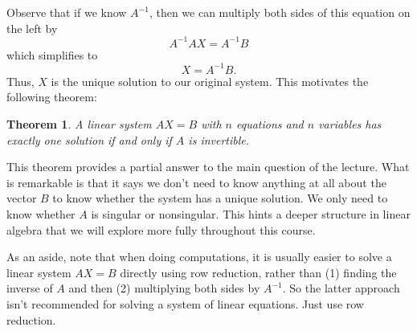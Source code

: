 \documentclass[10pt]{article}
\newtheorem{theorem}{Theorem}
\theoremstyle{definition}
\begin{document}
Observe that if we know $A^{-1}$, then we can multiply both sides of this
equation on the left by
\begin{equation*}
  A^{-1}AX = A^{-1}B
\end{equation*}
which simplifies to
\begin{equation}
  \label{eq:inverse-solution-to-linear-equation}
  X = A^{-1}B.
\end{equation}
Thus, $X$ is the unique solution to our original system. This motivates the
following theorem:
\begin{theorem}
  \label{thm:unique-solution-invertibility}
  A linear system $AX=B$ with $n$ equations and $n$ variables has exactly one
  solution if and only if $A$ is invertible.
\end{theorem}

This theorem provides a partial answer to the main question of the lecture.
What is remarkable is that it says we don't need to know anything at all about
the vector $B$ to know whether the system has a unique solution. We only need
to know whether $A$ is singular or nonsingular. This hints a deeper structure
in linear algebra that we will explore more fully throughout this course.

As an aside, note that when doing computations, it is usually easier to solve
a linear system $AX=B$ directly using row reduction, rather than (1) finding
the inverse of $A$ and then (2) multiplying both sides by $A^{-1}$. So the
latter approach isn't recommended for solving a system of linear equations.
Just use row reduction.
\end{document}
